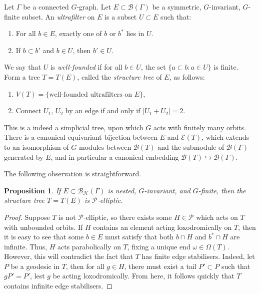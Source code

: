 \documentclass[11pt,a4paper]{amsart}
\newcommand{\into}{\hookrightarrow}
\newtheorem{proposition}[theorem]{Proposition}
\theoremstyle{definition}
\newcommand{\per}{\mathcal{H}}
\newcommand{\br}{{\mathscr{B}}}
\begin{document}
Let $\Gamma$ be a connected $G$-graph. 
Let $E \subset \br(\Gamma)$ be a symmetric, $G$-invariant, $G$-finite subset. An \emph{ultrafilter} on $E$ is a subset $U \subset E$ such that:
\begin{enumerate}
    \item For all $b \in E$, exactly one of $b$ or $b^\ast$ lies in $U$.

    \item If $b \subset b'$ and $b \in U$, then $b' \in U$. 
\end{enumerate}
We say that $U$ is \emph{well-founded} if for all $b \in U$, the set $\{a \subset b : a \in U\}$ is finite.
Form a tree $T = T(E)$, called the \emph{structure tree} of $E$, as follows:
\begin{enumerate}
    \item $V(T) = \{\text{well-founded ultrafilters on $E$}\}$,

    \item Connect $U_1$, $U_2$ by an edge if and only if $|U_1 + U_2| = 2$. 
\end{enumerate}
This is a indeed a simplicial tree, upon which $G$ acts with finitely many orbits. There is a  canonical equivariant bijection between $E$ and $\mathscr E(T)$, which extends to an isomorphism of $G$-modules between $\br(T)$ and the submodule of $\br(\Gamma)$ generated by $E$, and in particular a canonical embedding $\br(T) \into \br(\Gamma)$.

The following observation is straightforward.

\begin{proposition}\label{prop:structure-tree-elliptic}
    If $E \subset \br_\per(\Gamma)$ is nested, $G$-invariant, and $G$-finite, then the structure tree $T = T(E)$ is $\mathcal P$-elliptic. 
\end{proposition}

\begin{proof}
    Suppose $T$ is not $\mathcal P$-elliptic, so there exists some $H \in \mathcal P$ which acts on $T$ with unbounded orbits.
    If $H$ contains an element acting loxodromically on $T$, then it is easy to see that some $b \in E$ must satisfy that both $b \cap H$ and $b^\ast \cap H$ are infinite. Thus, $H$ acts parabolically on $T$, fixing a unique end $\omega \in \Omega(T)$. However, this will contradict the fact that $T$ has finite edge stabilisers. Indeed, let $P$ be a geodesic in $T$, then for all $g \in H$, there must exist a tail $P' \subset P$ such that $gP' = P'$, lest $g$ be acting loxodromically. From here, it follows quickly that $T$ contains infinite edge stabilisers. 
\end{proof}
\end{document}
